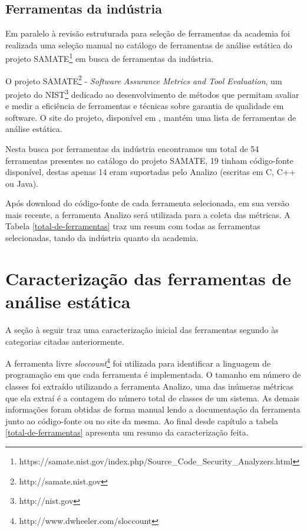 \subsection{Ferramentas da indústria}

Em paralelo à revisão estruturada para seleção de ferramentas da academia
foi realizada uma seleção manual no catálogo de ferramentas de análise estática do projeto
SAMATE\footnote{https://samate.nist.gov/index.php/Source\_Code\_Security\_Analyzers.html}
em busca de ferramentas da indústria.

O projeto SAMATE\footnote{http://samate.nist.gov} - {\em Software Assurance
Metrics and Tool Evaluation}, um projeto do NIST\footnote{http://nist.gov}
dedicado ao desenvolvimento de métodos que permitam avaliar e medir a
eficiência de ferramentas e técnicas sobre garantia de qualidade em software.
O site do projeto, disponível em , mantém uma lista
de ferramentas de análise estática.

Nesta busca por ferramentas da indústria encontramos um total de 54 ferramentas
presentes no catálogo do projeto SAMATE, 19 tinham código-fonte disponível,
destas apenas 14 eram suportadas pelo Analizo (escritas em C, C++ ou Java).

Após download do código-fonte de cada ferramenta selecionada, em sua versão
mais recente, a ferramenta Analizo será utilizada para a coleta das métricas. 
A Tabela \ref{total-de-ferramentas} traz um resum com todas as ferramentas
selecionadas, tando da indústria quanto da academia.

\section{Caracterização das ferramentas de análise estática}

A seção à seguir traz uma caracterização inicial das ferramentas segundo às
categorias citadas anteriormente.

A ferramenta livre {\it sloccount}\footnote{http://www.dwheeler.com/sloccount}
foi utilizada para identificar a linguagem de programação em que cada
ferramenta é implementada. O tamanho em número de classes foi extraído utilizando a ferramenta
Analizo, uma das inúmeras métricas que ela extraí é a contagem do número total
de classes de um sistema. As demais informações foram obtidas de forma manual
lendo a documentação da ferramenta junto ao código-fonte ou no site da mesma.
Ao final desde capítulo a tabela \ref{total-de-ferramentas} apresenta um resumo
da caracterização feita.

